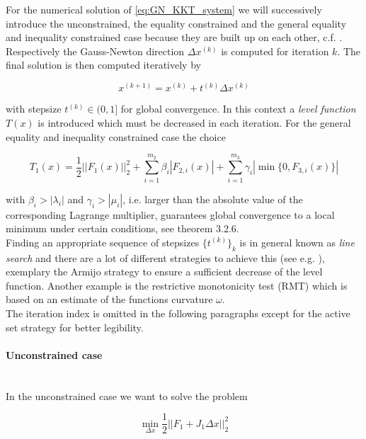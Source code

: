 \documentclass{scrartcl}[12pt, halfparskip]
\numberwithin{equation}{section}
\numberwithin{figure}{section}
\numberwithin{table}{section}
\begin{document}
For the numerical solution of \cref{eq:GN_KKT_system} we will successively introduce the unconstrained, the equality constrained and the general equality and inequality constrained case because they are built up on each other, c.f. \cite{numerical_methods_lsq_Bjorck}. Respectively the Gauss-Newton direction $\Delta x^{(k)}$ is computed for iteration $k$. The final solution is then computed iteratively by

\begin{equation}
	x^{(k+1)} = x^{(k)} + t^{(k)} \Delta x^{(k)}
\end{equation}

with stepsize $t^{(k)} \in (0,1]$ for global convergence. In this context a \textit{level function} $T(x)$ is introduced which must be decreased in each iteration. For the general equality and inequality constrained case the choice

\begin{equation}
	T_1(x) = \frac{1}{2} || F_1(x) ||_2^2 + \sum_{i=1}^{m_2} \beta_i | F_{2,i}(x) | + \sum_{i=1}^{m_3} \gamma_i | \min\{0,F_{3,i}(x)\} |
\end{equation}

with $\beta_i > |\lambda_i|$ and $\gamma_i > |\mu_i|$, i.e. larger than the absolute value of the corresponding Lagrange multiplier, guarantees global convergence to a local minimum under certain conditions, see \cite{diss_bock} theorem 3.2.6. \\
Finding an appropriate sequence of stepsizes $\{ t^{(k)} \}_k$ is in general known as \textit{line search} and there are a lot of different strategies to achieve this (see e.g. \cite{nonlinear_optimiziation_wright}), exemplary the Armijo strategy to ensure a sufficient decrease of the level function. Another example is the restrictive monotonicity test (RMT) which is based on an estimate of the functions curvature $\omega$. \\

The iteration index is omitted in the following paragraphs except for the active set strategy for better legibility.

\paragraph{Unconstrained case}\mbox{}\\
In the unconstrained case we want to solve the problem

\begin{equation}
\min_{\Delta x} \frac{1}{2} || F_1 + J_1 \Delta x ||_2^2
\label{eq:numerical_solution_LSQ}
\end{equation}
\end{document}
